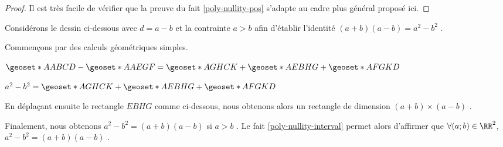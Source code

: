 \begin{proof}
	Il est très facile de vérifier que la preuve du fait \ref{poly-nullity-pos} s'adapte au cadre plus général proposé ici.
\end{proof}




\medskip

\begin{example}
Considérons le dessin ci-dessous avec $d = a - b$ et la contrainte $a > b$ afin d'établir l'identité $(a+b)(a-b) = a^2 - b^2$ .


\smallskip

\begin{center}
\end{center}


\medskip


Commençons par des calculs géométriques simples.

\smallskip
	
$\geoset*{A}{ABCD} - \geoset*{A}{AEGF} = \geoset*{A}{GHCK} + \geoset*{A}{EBHG} + \geoset*{A}{FGKD}$
	
\smallskip
	
$a^2 - b^2 = \geoset*{A}{GHCK} + \geoset*{A}{EBHG} + \geoset*{A}{FGKD}$


\medskip

En déplaçant ensuite le rectangle $EBHG$ comme ci-dessous, nous obtenons alors un rectangle de dimension $(a+b) \times (a-b)$ . 
	

\smallskip

\begin{center}
\end{center}


\medskip

Finalement, nous obtenons $a^2 - b^2 = (a+b)(a-b)$ si $a > b$ .
Le fait \ref{poly-nullity-interval} permet alors d'affirmer que $\forall (a ;b) \in \RR^2$, $a^2 - b^2 = (a+b)(a-b)$ .
\end{example}
